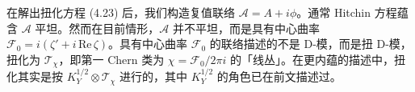 在解出扭化方程 (4.23) 后，我们构造复值联络 $\mathcal{A}=A+i\phi$。通常 Hitchin 方程蕴含 $\mathcal{A}$ 平坦。然而在目前情形，$\mathcal{A}$ 并不平坦，而是具有中心曲率 $\mathcal{F}_0=i(\zeta'+i\,\mathrm{Re}\,\zeta)$。具有中心曲率 $\mathcal{F}_0$ 的联络描述的不是 D-模，而是扭 D-模，扭化为 $\mathcal{T}_\chi$，即第一 Chern 类为 $\chi=\mathcal{F}_0/2\pi i$ 的「线丛」。在更内蕴的描述中，扭化其实是按 $K_Y^{1/2}\otimes\mathcal{T}_\chi$ 进行的，其中 $K_Y^{1/2}$ 的角色已在前文描述过。

